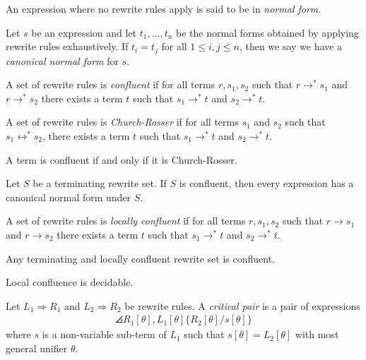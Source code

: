 \documentclass{article}
\begin{document}
\begin{definition}
	An expression where no rewrite rules apply is said to be in \emph{normal form}.
\end{definition}

\begin{definition}
	Let $s$ be an expression and let $t_1, ..., t_n$ be the normal forms obtained by
	applying rewrite rules exhaustively. If $t_i=t_j$ for all $1\leq i,j\leq n$, then we
	say we have a \emph{canonical normal form} for $s$.
\end{definition}

\begin{definition}
	A set of rewrite rules is \emph{confluent} if for all terms $r,s_1,s_2$ such that
	$r\to^*s_1$ and $r\to^*s_2$ there exists a term $t$ such that
	$s_1\to^*t$ and $s_2\to^*t$.
\end{definition}

\begin{definition}
	A set of rewrite rules is \emph{Church-Rosser} if for all terms $s_1$ and $s_2$
	such that $s_1\leftrightarrow^* s_2$, there exists a term $t$ such that $s_1\to^*t$
	and $s_2\to^* t$.
\end{definition}

\begin{theorem}
	A term is confluent if and only if it is Church-Rosser.
\end{theorem}

\begin{theorem}
	Let $S$ be a terminating rewrite set. If $S$ is confluent, then every expression has a
	canonical normal form under $S$.
\end{theorem}

\begin{definition}
	A set of rewrite rules is \emph{locally confluent} if for all terms $r,s_1,s_2$ such that
	$r\to s_1$ and $r\to s_2$ there exists a term $t$ such that
	$s_1\to^*t$ and $s_2\to^*t$.
\end{definition}

\begin{lemma}[Newman]
	Any terminating and locally confluent rewrite set is confluent.
\end{lemma}

\begin{theorem}
	Local confluence is decidable.
\end{theorem}

\begin{definition}
	Let $L_1\Rightarrow R_1$ and $L_2\Rightarrow R_2$ be rewrite rules. A \emph{critical pair} is
	a pair of expressions
	\begin{align*}
		\angles{R_1[\theta], L_1[\theta]\{R_2[\theta]/s[\theta]\}}
	\end{align*}
	where $s$ is a non-variable sub-term of $L_1$ such that $s[\theta]=L_2[\theta]$ with
	most general unifier $\theta$.
\end{definition}
\end{document}
